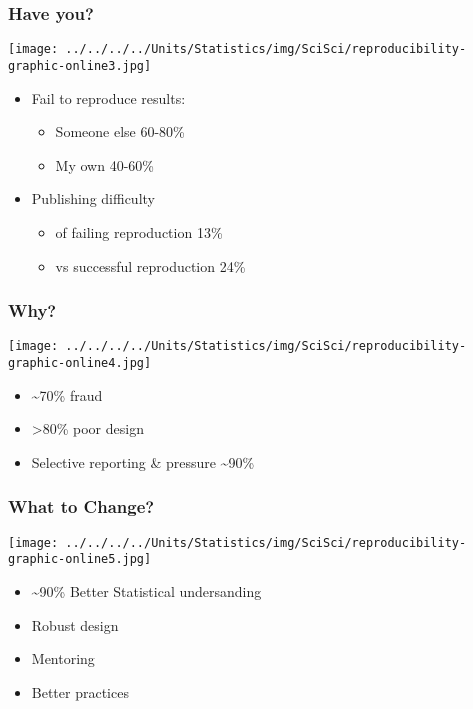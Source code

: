 \documentclass[10pt,article]{article}
\begin{document}
\subsubsection{Have you?}
\label{sec:org5b526e8}
\begin{center}
\texttt{[image: ../../../../Units/Statistics/img/SciSci/reproducibility-graphic-online3.jpg]}
\end{center}
\begin{itemize}
\item Fail to reproduce results:
\begin{itemize}
\item Someone else 60-80\%
\item My own 40-60\%
\end{itemize}
\item Publishing difficulty
\begin{itemize}
\item of failing reproduction 13\%
\item vs successful reproduction 24\%
\end{itemize}
\end{itemize}

\subsubsection{Why?}
\label{sec:orga67571e}
\begin{center}
\texttt{[image: ../../../../Units/Statistics/img/SciSci/reproducibility-graphic-online4.jpg]}
\end{center}
\begin{itemize}
\item \textasciitilde{}70\% fraud
\item >80\% poor design
\item Selective reporting \& pressure \textasciitilde{}90\%
\end{itemize}

\subsubsection{What to Change?}
\label{sec:org3c1bb62}
\begin{center}
\texttt{[image: ../../../../Units/Statistics/img/SciSci/reproducibility-graphic-online5.jpg]}
\end{center}
\begin{itemize}
\item \textasciitilde{}90\% Better Statistical undersanding
\item Robust design
\item Mentoring
\item Better practices
\end{itemize}
\end{document}
